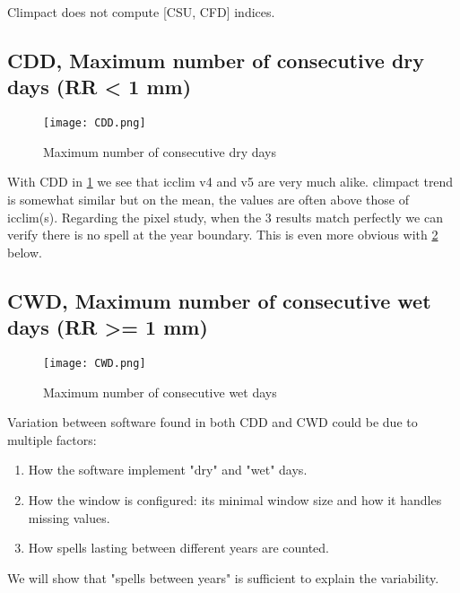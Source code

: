 \documentclass[a4paper,11pt]{article}
\begin{document}
        Climpact does not compute [CSU, CFD] indices.

        \subsection{CDD, Maximum number of consecutive dry days (RR < 1 mm)}
            \begin{figure}[!hbt]
                \centering
                \texttt{[image: CDD.png]}
                \caption{Maximum number of consecutive dry days}
                \label{figure/cdd}
            \end{figure}
            With CDD in \ref{figure/cdd} we see that icclim v4 and v5 are very much alike.
            climpact trend is somewhat similar but on the mean, the values are often above those of icclim(s).
            Regarding the pixel study, when the 3 results match perfectly we can verify there is no spell at the year boundary.
            This is even more obvious with \ref{figure/cwd} below.

        \subsection{CWD, Maximum number of consecutive wet days (RR >= 1 mm)}
            \begin{figure}[!hbt]
                \centering
                \texttt{[image: CWD.png]}
                \caption{Maximum number of consecutive wet days}
                \label{figure/cwd}
            \end{figure}

        Variation between software found in both CDD and CWD could be due to multiple factors:
        \begin{enumerate}
            \item How the software implement "dry" and "wet" days.
            \item How the window is configured: its minimal window size and how it handles missing values.
            \item How spells lasting between different years are counted.
        \end{enumerate}

        We will show that "spells between years" is sufficient to explain the variability.
        
\end{document}
